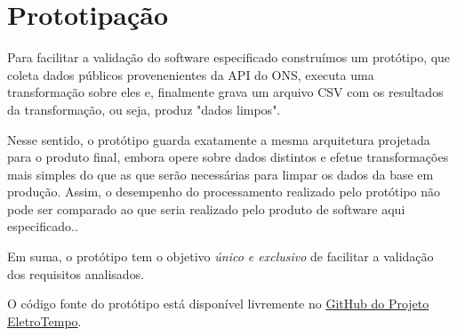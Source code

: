 \documentclass[a4paper, 12pt]{report}
\begin{document}
\section{Prototipação}
\begin{doublespace}
\begin{comment}


Para facilitar a validação do software especificado construímos um protótipo, utilizando dados públicos provenenientes da API do ONS para criar uma base relacional em \href{https://www.sqlite.org/index.html}{SQLite 3}.  A partir da base coletada, criou-se um procedimento que gera uma outra base por meio da poluição e corrompimento aleatório dos dados da base coletada.

A base poluída, então, serve como simulação da base relacional efetivamente existente no ONS.  É a base poluída que passa pelos procedimentos de pré-processamento para gerar uma base limpa.  Compara-se, por fim, a base limpa com a base coletada em termos de erro quadrático médio das observações distintas.

Vale notar, porém, que o resultado da comparação, de modo algum, reflete a eficiência do produto de software aqui especificado, tendo em vista o tamanho da base coletada e a simplicidade dos métodos implementados para limpeza da base poluída.

Em suma, o protótipo tem o objetivo \textit{único e exclusivo} de facilitar a validação dos requisitos analisados.

O código fonte do protótipo está disponível livremente no GitHub do Projeto.

\end{comment}


Para facilitar a validação do software especificado construímos um protótipo, que coleta dados públicos provenenientes da API do ONS, executa uma transformação sobre eles e, finalmente grava um arquivo CSV com os resultados da transformação, ou seja, produz "dados limpos".

Nesse sentido, o protótipo guarda exatamente a mesma arquitetura projetada para o produto final, embora opere sobre dados distintos e efetue transformações mais simples do que as que serão necessárias para limpar os dados da base em produção.  Assim, o desempenho do processamento realizado pelo protótipo não pode ser comparado ao que seria realizado pelo produto de software aqui especificado..

Em suma, o protótipo tem o objetivo \textit{único e exclusivo} de facilitar a validação dos requisitos analisados.

O código fonte do protótipo está disponível livremente no \href{https://github.com/ecompfin-ufrgs/eletrotempo}{GitHub do Projeto EletroTempo}.



\end{doublespace}
\end{document}
